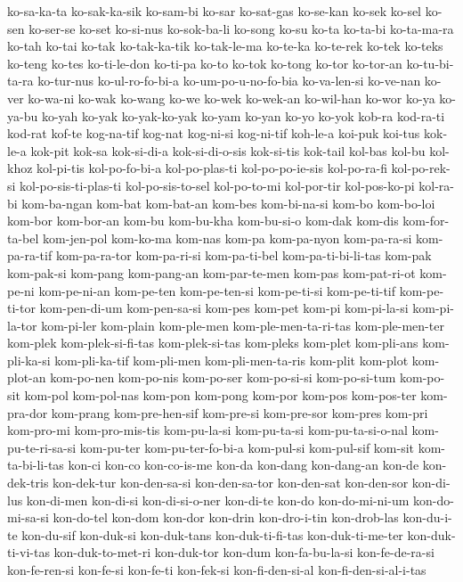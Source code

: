 {ko-sa-ka-ta ko-sak-ka-sik ko-sam-bi ko-sar ko-sat-gas ko-se-kan ko-sek
ko-sel ko-sen ko-ser-se ko-set ko-si-nus ko-sok-ba-li ko-song ko-su ko-ta
ko-ta-bi ko-ta-ma-ra ko-tah ko-tai ko-tak ko-tak-ka-tik ko-tak-le-ma
ko-te-ka ko-te-rek ko-tek ko-teks ko-teng ko-tes ko-ti-le-don ko-ti-pa
ko-to ko-tok ko-tong ko-tor ko-tor-an ko-tu-bi-ta-ra ko-tur-nus
ko-ul-ro-fo-bi-a ko-um-po-u-no-fo-bia ko-va-len-si ko-ve-nan ko-ver
ko-wa-ni ko-wak ko-wang ko-we ko-wek ko-wek-an ko-wil-han ko-wor ko-ya
ko-ya-bu ko-yah ko-yak ko-yak-ko-yak ko-yam ko-yan ko-yo ko-yok kob-ra
kod-ra-ti kod-rat kof-te kog-na-tif kog-nat kog-ni-si kog-ni-tif koh-le-a
koi-puk koi-tus kok-le-a kok-pit kok-sa kok-si-di-a kok-si-di-o-sis
kok-si-tis kok-tail kol-bas kol-bu kol-khoz kol-pi-tis kol-po-fo-bi-a
kol-po-plas-ti kol-po-po-ie-sis kol-po-ra-fi kol-po-rek-si
kol-po-sis-ti-plas-ti kol-po-sis-to-sel kol-po-to-mi kol-por-tir
kol-pos-ko-pi kol-ra-bi kom-ba-ngan kom-bat kom-bat-an kom-bes
kom-bi-na-si kom-bo kom-bo-loi kom-bor kom-bor-an kom-bu kom-bu-kha
kom-bu-si-o kom-dak kom-dis kom-for-ta-bel kom-jen-pol kom-ko-ma kom-nas
kom-pa kom-pa-nyon kom-pa-ra-si kom-pa-ra-tif kom-pa-ra-tor kom-pa-ri-si
kom-pa-ti-bel kom-pa-ti-bi-li-tas kom-pak kom-pak-si kom-pang kom-pang-an
kom-par-te-men kom-pas kom-pat-ri-ot kom-pe-ni kom-pe-ni-an kom-pe-ten
kom-pe-ten-si kom-pe-ti-si kom-pe-ti-tif kom-pe-ti-tor kom-pen-di-um
kom-pen-sa-si kom-pes kom-pet kom-pi kom-pi-la-si kom-pi-la-tor kom-pi-ler
kom-plain kom-ple-men kom-ple-men-ta-ri-tas kom-ple-men-ter kom-plek
kom-plek-si-fi-tas kom-plek-si-tas kom-pleks kom-plet kom-pli-ans
kom-pli-ka-si kom-pli-ka-tif kom-pli-men kom-pli-men-ta-ris kom-plit
kom-plot kom-plot-an kom-po-nen kom-po-nis kom-po-ser kom-po-si-si
kom-po-si-tum kom-po-sit kom-pol kom-pol-nas kom-pon kom-pong kom-por
kom-pos kom-pos-ter kom-pra-dor kom-prang kom-pre-hen-sif kom-pre-si
kom-pre-sor kom-pres kom-pri kom-pro-mi kom-pro-mis-tis kom-pu-la-si
kom-pu-ta-si kom-pu-ta-si-o-nal kom-pu-te-ri-sa-si kom-pu-ter
kom-pu-ter-fo-bi-a kom-pul-si kom-pul-sif kom-sit kom-ta-bi-li-tas kon-ci
kon-co kon-co-is-me kon-da kon-dang kon-dang-an kon-de kon-dek-tris
kon-dek-tur kon-den-sa-si kon-den-sa-tor kon-den-sat kon-den-sor
kon-di-lus kon-di-men kon-di-si kon-di-si-o-ner kon-di-te kon-do
kon-do-mi-ni-um kon-do-mi-sa-si kon-do-tel kon-dom kon-dor kon-drin
kon-dro-i-tin kon-drob-las kon-du-i-te kon-du-sif kon-duk-si kon-duk-tans
kon-duk-ti-fi-tas kon-duk-ti-me-ter kon-duk-ti-vi-tas kon-duk-to-met-ri
kon-duk-tor kon-dum kon-fa-bu-la-si kon-fe-de-ra-si kon-fe-ren-si
kon-fe-si kon-fe-ti kon-fek-si kon-fi-den-si-al kon-fi-den-si-al-i-tas
}
